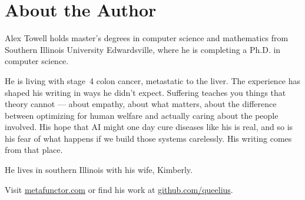 \chapter*{About the Author}

Alex Towell holds master's degrees in computer science and mathematics from Southern Illinois University Edwardsville, where he is completing a Ph.D. in computer science.

He is living with stage~4 colon cancer, metastatic to the liver. The experience has shaped his writing in ways he didn't expect. Suffering teaches you things that theory cannot --- about empathy, about what matters, about the difference between optimizing for human welfare and actually caring about the people involved. His hope that AI might one day cure diseases like his is real, and so is his fear of what happens if we build those systems carelessly. His writing comes from that place.

He lives in southern Illinois with his wife, Kimberly.

\medskip

\noindent Visit \href{https://metafunctor.com}{metafunctor.com} or find his work at \href{https://github.com/queelius}{github.com/queelius}.

\clearpage
